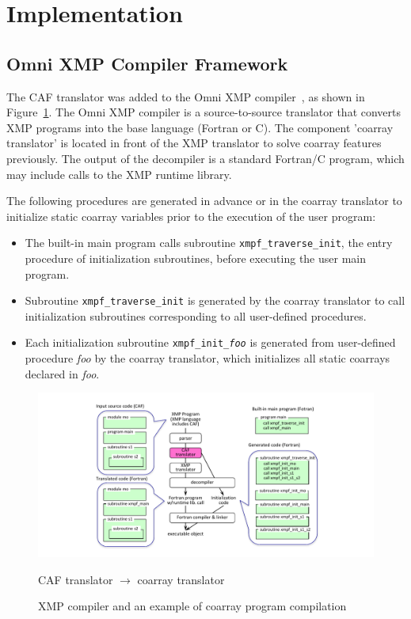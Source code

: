 ﻿\section{Implementation}\label{sec:implement}

\subsection{Omni XMP Compiler Framework}

The CAF translator was added to the Omni XMP compiler~\cite{omni}, 
as shown in Figure~\ref{fig:translator}.
The Omni XMP compiler is a source-to-source translator that converts XMP programs 
into the base language (Fortran or C). The component 'coarray translator' is 
located in front of the XMP translator to solve coarray features previously.   
The output of the decompiler is a standard Fortran/C program, which may include 
calls to the XMP runtime library.

The following procedures are generated in advance or in the coarray translator
to initialize static coarray variables prior to the execution of the user program:
\begin{itemize}
\item
The built-in main program calls subroutine {\tt xmpf\_traverse\_init},
the entry procedure of initialization subroutines, before executing the
user main program.
\item
Subroutine {\tt xmpf\_traverse\_init} is generated by the coarray translator 
to call initialization subroutines corresponding to all user-defined procedures.
\item
Each initialization subroutine {\tt xmpf\_init\_{\it foo}} is generated from 
user-defined procedure {\it foo} by the coarray translator, which initializes all static coarrays declared in {\it foo}.
\end{itemize}

\begin{figure}[tbh]
 \begin{center}
  \includegraphics[trim=30mm 0mm 20mm 7mm, scale=1.0]{figs/translator-tmp.pdf}
  \caption{XMP compiler and an example of coarray program compilation}
  \label{fig:translator}
  CAF translator $\rightarrow$ coarray translator
 \end{center}
\end{figure}


